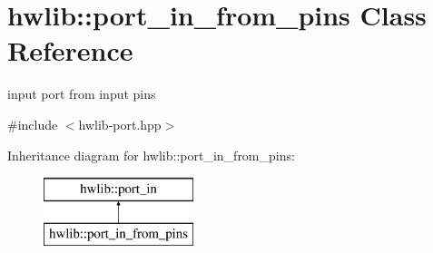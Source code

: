 \hypertarget{classhwlib_1_1port__in__from__pins}{}\section{hwlib\+:\+:port\+\_\+in\+\_\+from\+\_\+pins Class Reference}
\label{classhwlib_1_1port__in__from__pins}


input port from input pins  




{\ttfamily \#include $<$hwlib-\/port.\+hpp$>$}

Inheritance diagram for hwlib\+:\+:port\+\_\+in\+\_\+from\+\_\+pins\+:\begin{figure}[H]
\begin{center}
\leavevmode
\includegraphics[height=2.000000cm]{classhwlib_1_1port__in__from__pins}
\end{center}
\end{figure}
